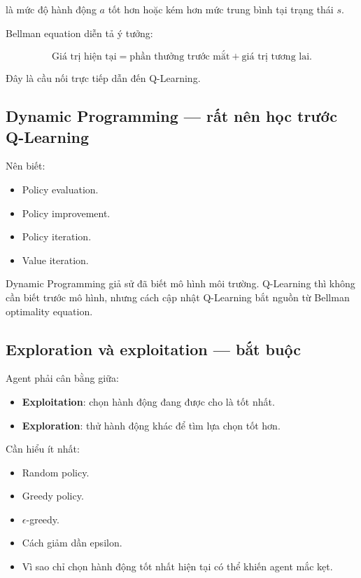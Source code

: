 \documentclass[12pt,a4paper]{article}
\begin{document}
là mức độ hành động $a$ tốt hơn hoặc kém hơn mức trung bình tại trạng thái $s$.

Bellman equation diễn tả ý tưởng:

\begin{equation}
\text{Giá trị hiện tại}
=
\text{phần thưởng trước mắt}
+
\text{giá trị tương lai}.
\end{equation}

Đây là cầu nối trực tiếp dẫn đến Q-Learning.

\subsection{Dynamic Programming --- rất nên học trước Q-Learning}

Nên biết:

\begin{itemize}[leftmargin=1.5em]
    \item Policy evaluation.
    \item Policy improvement.
    \item Policy iteration.
    \item Value iteration.
\end{itemize}

Dynamic Programming giả sử đã biết mô hình môi trường. Q-Learning thì không cần biết trước mô hình, nhưng cách cập nhật Q-Learning bắt nguồn từ Bellman optimality equation.

\subsection{Exploration và exploitation --- bắt buộc}

Agent phải cân bằng giữa:

\begin{itemize}[leftmargin=1.5em]
    \item \textbf{Exploitation}: chọn hành động đang được cho là tốt nhất.
    \item \textbf{Exploration}: thử hành động khác để tìm lựa chọn tốt hơn.
\end{itemize}

Cần hiểu ít nhất:

\begin{itemize}[leftmargin=1.5em]
    \item Random policy.
    \item Greedy policy.
    \item $\epsilon$-greedy.
    \item Cách giảm dần epsilon.
    \item Vì sao chỉ chọn hành động tốt nhất hiện tại có thể khiến agent mắc kẹt.
\end{itemize}
\end{document}
